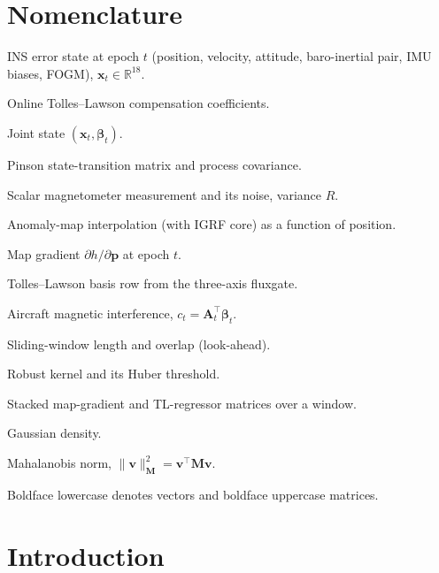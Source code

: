 \documentclass{IEEEtaes}
\begin{document}
\section*{Nomenclature}
\begin{IEEEdescription}
\item[$\mathbf{x}_t$] INS error state at epoch $t$ (position, velocity, attitude,
baro-inertial pair, IMU biases, FOGM), $\mathbf{x}_t\in\mathbb{R}^{18}$.
\item[$\boldsymbol{\beta}_t$] Online Tolles--Lawson compensation coefficients.
\item[$\boldsymbol{\chi}_t$] Joint state $(\mathbf{x}_t,\boldsymbol{\beta}_t)$.
\item[$\boldsymbol{\Phi}_t,\mathbf{Q}_t$] Pinson state-transition matrix and process
covariance.
\item[$z_t,\,\eta_t$] Scalar magnetometer measurement and its noise, variance $R$.
\item[$h(\cdot)$] Anomaly-map interpolation (with IGRF core) as a function of
position.
\item[$\mathbf{g}_t$] Map gradient $\partial h/\partial\mathbf{p}$ at epoch $t$.
\item[$\mathbf{A}_t$] Tolles--Lawson basis row from the three-axis fluxgate.
\item[$c_t$] Aircraft magnetic interference, $c_t=\mathbf{A}_t^{\top}\boldsymbol{\beta}_t$.
\item[$L_w,\,L_o$] Sliding-window length and overlap (look-ahead).
\item[$\rho,\,\delta$] Robust kernel and its Huber threshold.
\item[$\mathbf{G},\boldsymbol{\Psi}$] Stacked map-gradient and TL-regressor matrices
over a window.
\item[$\mathcal{N}(\cdot,\cdot)$] Gaussian density.
\item[$\lVert\cdot\rVert_{\mathbf{M}}$] Mahalanobis norm,
$\lVert\mathbf{v}\rVert^2_{\mathbf{M}}=\mathbf{v}^{\top}\mathbf{M}\mathbf{v}$.
\end{IEEEdescription}

\noindent Boldface lowercase denotes vectors and boldface uppercase matrices.

\section{Introduction}
\end{document}
